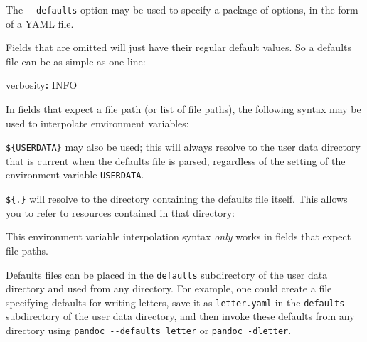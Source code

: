 \documentclass[
  a4paper,
]{article}
\newenvironment{Shaded}{}{}
\newcommand{\AttributeTok}[1]{\textcolor[rgb]{0.49,0.56,0.16}{#1}}
\newcommand{\CommentTok}[1]{\textcolor[rgb]{0.38,0.63,0.69}{\textit{#1}}}
\newcommand{\FunctionTok}[1]{\textcolor[rgb]{0.02,0.16,0.49}{#1}}
\newcommand{\KeywordTok}[1]{\textcolor[rgb]{0.00,0.44,0.13}{\textbf{#1}}}
\begin{document}
The \texttt{-\/-defaults} option may be used to specify a package of
options, in the form of a YAML file.

Fields that are omitted will just have their regular default values. So
a defaults file can be as simple as one line:

\begin{Shaded}
\begin{Highlighting}[]
\FunctionTok{verbosity}\KeywordTok{:}\AttributeTok{ INFO}
\end{Highlighting}
\end{Shaded}

In fields that expect a file path (or list of file paths), the following
syntax may be used to interpolate environment variables:

\begin{Shaded}
\end{Shaded}

\texttt{\$\{USERDATA\}} may also be used; this will always resolve to
the user data directory that is current when the defaults file is
parsed, regardless of the setting of the environment variable
\texttt{USERDATA}.

\texttt{\$\{.\}} will resolve to the directory containing the defaults
file itself. This allows you to refer to resources contained in that
directory:

\begin{Shaded}
\end{Shaded}

This environment variable interpolation syntax \emph{only} works in
fields that expect file paths.

Defaults files can be placed in the \texttt{defaults} subdirectory of
the user data directory and used from any directory. For example, one
could create a file specifying defaults for writing letters, save it as
\texttt{letter.yaml} in the \texttt{defaults} subdirectory of the user
data directory, and then invoke these defaults from any directory using
\texttt{pandoc\ -\/-defaults\ letter} or \texttt{pandoc\ -dletter}.
\end{document}
